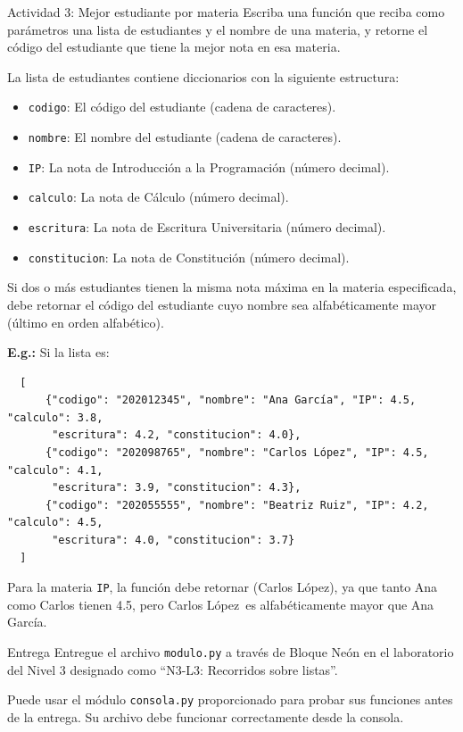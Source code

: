 \documentclass{ip-lab}
\begin{document}
\pagebreak

\begin{sectionbox}{Actividad 3: Mejor estudiante por materia}
  Escriba una función que reciba como parámetros una lista de estudiantes y el nombre de una materia, y retorne el código del estudiante que tiene la mejor nota en esa materia.

  La lista de estudiantes contiene diccionarios con la siguiente estructura:
  \begin{itemize}
      \item \texttt{codigo}: El código del estudiante (cadena de caracteres).
      \item \texttt{nombre}: El nombre del estudiante (cadena de caracteres).
      \item \texttt{IP}: La nota de Introducción a la Programación (número decimal).
      \item \texttt{calculo}: La nota de Cálculo (número decimal).
      \item \texttt{escritura}: La nota de Escritura Universitaria (número decimal).
      \item \texttt{constitucion}: La nota de Constitución (número decimal).
  \end{itemize}

  Si dos o más estudiantes tienen la misma nota máxima en la materia especificada, debe retornar el código del estudiante cuyo nombre sea alfabéticamente mayor (último en orden alfabético).

  \textbf{E.g.:} Si la lista es:
  \begin{verbatim}
  [
      {"codigo": "202012345", "nombre": "Ana García", "IP": 4.5, "calculo": 3.8, 
       "escritura": 4.2, "constitucion": 4.0},
      {"codigo": "202098765", "nombre": "Carlos López", "IP": 4.5, "calculo": 4.1, 
       "escritura": 3.9, "constitucion": 4.3},
      {"codigo": "202055555", "nombre": "Beatriz Ruiz", "IP": 4.2, "calculo": 4.5, 
       "escritura": 4.0, "constitucion": 3.7}
  ]
  \end{verbatim}
  
  Para la materia \texttt{\textquotedbl IP\textquotedbl}, la función debe retornar \texttt{\textquotedbl} (Carlos López), ya que tanto Ana como Carlos tienen 4.5, pero \textquotedbl Carlos López\textquotedbl\ es alfabéticamente mayor que \textquotedbl Ana García\textquotedbl.
\end{sectionbox}

\begin{sectionbox}{Entrega}
Entregue el archivo \texttt{modulo.py} a través de Bloque Neón en el laboratorio del Nivel 3 designado como ``N3-L3: Recorridos sobre listas''.

Puede usar el módulo \texttt{consola.py} proporcionado para probar sus funciones antes de la entrega. Su archivo debe funcionar correctamente desde la consola.
\end{sectionbox}
\end{document}
